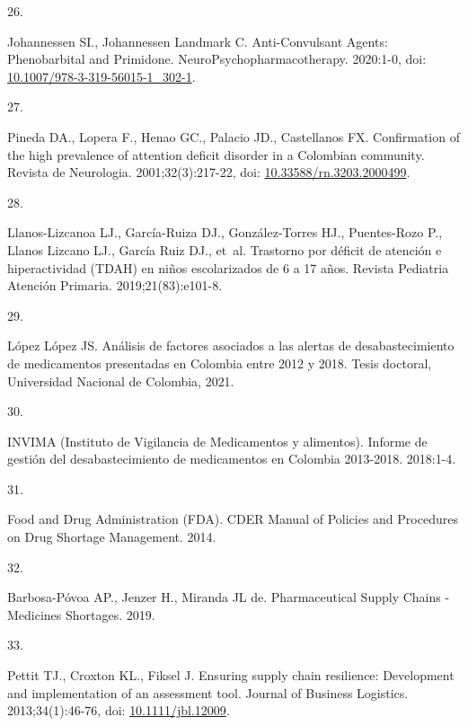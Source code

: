 \documentclass[
  oneside]{book}
\newlength{\cslhangindent}
\newlength{\csllabelwidth}
\newlength{\cslentryspacingunit} %
\newenvironment{CSLReferences}[2] %
 {%
  \setlength{\parindent}{0pt}
  \ifodd #1
  \let\oldpar\par
  \def\par{\hangindent=\cslhangindent\oldpar}
  \fi
  \setlength{\parskip}{#2\cslentryspacingunit}
 }%
 {}
\newcommand{\CSLLeftMargin}[1]{\parbox[t]{\csllabelwidth}{#1}}
\newcommand{\CSLRightInline}[1]{\parbox[t]{\linewidth - \csllabelwidth}{#1}\break}
\begin{document}
\begin{CSLReferences}{0}{0}
\leavevmode{}%
\CSLLeftMargin{26. }
\CSLRightInline{Johannessen SI., Johannessen Landmark C. {Anti-Convulsant Agents: Phenobarbital and Primidone}. NeuroPsychopharmacotherapy. 2020:1-0, doi: \href{https://doi.org/10.1007/978-3-319-56015-1_302-1}{10.1007/978-3-319-56015-1\_302-1}.}

\leavevmode{}%
\CSLLeftMargin{27. }
\CSLRightInline{Pineda DA., Lopera F., Henao GC., Palacio JD., Castellanos FX. {Confirmation of the high prevalence of attention deficit disorder in a Colombian community}. Revista de Neurologia. 2001;32(3):217-22, doi: \href{https://doi.org/10.33588/rn.3203.2000499}{10.33588/rn.3203.2000499}.}

\leavevmode{}%
\CSLLeftMargin{28. }
\CSLRightInline{Llanos-Lizcanoa LJ., García-Ruiza DJ., González-Torres HJ., Puentes-Rozo P., Llanos Lizcano LJ., García Ruiz DJ., et~al. {Trastorno por d{é}ficit de atenci{ó}n e hiperactividad (TDAH) en ni{ñ}os escolarizados de 6 a 17 a{ñ}os}. Revista Pediatria Atenci{ó}n Primaria. 2019;21(83):e101-8.}

\leavevmode{}%
\CSLLeftMargin{29. }
\CSLRightInline{López López JS. {An{á}lisis de factores asociados a las alertas de desabastecimiento de medicamentos presentadas en Colombia entre 2012 y 2018}. Tesis doctoral, Universidad Nacional de Colombia, 2021.}

\leavevmode{}%
\CSLLeftMargin{30. }
\CSLRightInline{INVIMA (Instituto de Vigilancia de Medicamentos y alimentos). {Informe de gesti{ó}n del desabastecimiento de medicamentos en Colombia 2013-2018}. 2018:1-4.}

\leavevmode{}%
\CSLLeftMargin{31. }
\CSLRightInline{Food and Drug Administration (FDA). {CDER Manual of Policies and Procedures on Drug Shortage Management}. 2014.}

\leavevmode{}%
\CSLLeftMargin{32. }
\CSLRightInline{Barbosa-Póvoa AP., Jenzer H., Miranda JL de. {Pharmaceutical Supply Chains - Medicines Shortages}. 2019.}

\leavevmode{}%
\CSLLeftMargin{33. }
\CSLRightInline{Pettit TJ., Croxton KL., Fiksel J. {Ensuring supply chain resilience: Development and implementation of an assessment tool}. Journal of Business Logistics. 2013;34(1):46-76, doi: \href{https://doi.org/10.1111/jbl.12009}{10.1111/jbl.12009}.}


\end{CSLReferences}
\end{document}
